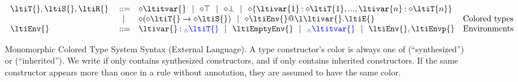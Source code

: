 \begin{figure}
$$\begin{array}{lrll}
  \ltiT{}, \ltiS{}, \ltiR{} &::=& 
                         \ltiSynChk{\ltitvar{}} \alt
                         \ltiSynChk{\ltiTop} \alt
                         \ltiSynChk{\ltiBot} \alt
                         \ltiSynChk{\ltiRec{\hastype{\ltivar{1}}{\ltiSynChk{\ltiT{1}}},...,\hastype{\ltivar{n}}{\ltiSynChk{\ltiT{n}}}}}
                                    \\&\alt&
                         \ltiSynChk{\ltiArrowMono{\ltiSynChk{\ltiT{}}}{\ltiSynChk{\ltiS{}}}} \alt
                         \ltiSynChk{\ltiClosure{\ltiEnv{}}{\ltiufun{\ltivar{}}{\ltiE{}}}}
                      &\mbox{Colored types} \\
  \ltiEnv{} &::=& \hastype{\ltivar{}}{\ltiSyn{\ltiT{}}} \alt
                  \ltiEmptyEnv{} \alt
                  \ltiSyn{\ltitvar{}} \alt
                  \ltiEnvConcat{\ltiEnv{}}{\ltiEnvp{}}
                      &\mbox{Environments} \\
\end{array}
$$
\caption{Monomorphic Colored Type System Syntax (External Language).
A type constructor's color \ltiSynChk{} is always one of \ltiSyn{} (``synthesized'') or \ltiChk{} (``inherited'').
We write \ltiSyn{\ltiT{}} if \ltiT{} only contains synthesized constructors, and 
\ltiChk{\ltiT{}} if \ltiT{} only contains inherited constructors.
If the same constructor appears more than once in a rule without annotation,
they are assumed to have the same color.
}
\end{figure}

